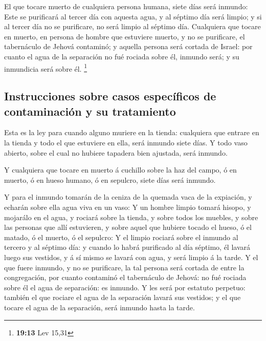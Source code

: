  El que tocare muerto de cualquiera persona humana, siete
días será inmundo:  Este se purificará al tercer día con
aquesta agua, y al séptimo día será limpio; y si al tercer día no se
purificare, no será limpio al séptimo día.  Cualquiera que
tocare en muerto, en persona de hombre que estuviere muerto, y no se
purificare, el tabernáculo de Jehová contaminó; y aquella persona será
cortada de Israel: por cuanto el agua de la separación no fué rociada
sobre él, inmundo será; y su inmundicia será sobre él. \footnote{\textbf{19:13}
  Lev 15,31}

\hypertarget{instrucciones-sobre-casos-especuxedficos-de-contaminaciuxf3n-y-su-tratamiento}{%
\subsection{Instrucciones sobre casos específicos de contaminación y su
tratamiento}\label{instrucciones-sobre-casos-especuxedficos-de-contaminaciuxf3n-y-su-tratamiento}}

 Esta es la ley para cuando alguno muriere en la tienda:
cualquiera que entrare en la tienda y todo el que estuviere en ella,
será inmundo siete días.  Y todo vaso abierto, sobre el
cual no hubiere tapadera bien ajustada, será inmundo.

 Y cualquiera que tocare en muerto á cuchillo sobre la haz
del campo, ó en muerto, ó en hueso humano, ó en sepulcro, siete días
será inmundo.

 Y para el inmundo tomarán de la ceniza de la quemada vaca
de la expiación, y echarán sobre ella agua viva en un vaso:
 Y un hombre limpio tomará hisopo, y mojarálo en el agua, y
rociará sobre la tienda, y sobre todos los muebles, y sobre las personas
que allí estuvieren, y sobre aquel que hubiere tocado el hueso, ó el
matado, ó el muerto, ó el sepulcro:  Y el limpio rociará
sobre el inmundo al tercero y al séptimo día: y cuando lo habrá
purificado al día séptimo, él lavará luego sus vestidos, y á sí mismo se
lavará con agua, y será limpio á la tarde.  Y el que fuere
inmundo, y no se purificare, la tal persona será cortada de entre la
congregación, por cuanto contaminó el tabernáculo de Jehová: no fué
rociada sobre él el agua de separación: es inmundo.  Y les
será por estatuto perpetuo: también el que rociare el agua de la
separación lavará sus vestidos; y el que tocare el agua de la
separación, será inmundo hasta la tarde.

